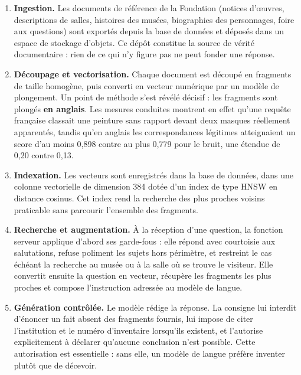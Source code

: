 \begin{enumerate}
  \item \textbf{Ingestion.} Les documents de référence de la Fondation (notices d'œuvres, descriptions de salles, histoires des musées,
        biographies des personnages, foire aux questions) sont exportés depuis
        la base de données et déposés dans un espace de stockage d'objets. Ce
        dépôt constitue la source de vérité documentaire : rien de ce qui n'y
        figure pas ne peut fonder une réponse.

  \item \textbf{Découpage et vectorisation.} Chaque document est découpé en
        fragments de taille homogène, puis converti en vecteur numérique par un
        modèle de plongement. Un point de méthode s'est révélé décisif : les
        fragments sont plongés \textbf{en anglais}. Les mesures conduites
        montrent en effet qu'une requête française classait une peinture sans
        rapport devant deux masques réellement apparentés, tandis qu'en anglais
        les correspondances légitimes atteignaient un score d'au moins 0,898
        contre au plus 0,779 pour le bruit, une étendue de 0,20 contre 0,13.

  \item \textbf{Indexation.} Les vecteurs sont enregistrés dans la base de
        données, dans une colonne vectorielle de dimension 384 dotée d'un index
        de type HNSW en distance cosinus. Cet index rend la recherche des plus
        proches voisins praticable sans parcourir l'ensemble des fragments.

  \item \textbf{Recherche et augmentation.} À la réception d'une question, la
        fonction serveur applique d'abord ses garde-fous : elle répond avec
        courtoisie aux salutations, refuse poliment les sujets hors périmètre,
        et restreint le cas échéant la recherche au musée ou à la salle où se
        trouve le visiteur. Elle convertit ensuite la question en vecteur,
        récupère les fragments les plus proches et compose l'instruction
        adressée au modèle de langue.

  \item \textbf{Génération contrôlée.} Le modèle rédige la réponse. La consigne
        lui interdit d'énoncer un fait absent des fragments fournis, lui impose
        de citer l'institution et le numéro d'inventaire lorsqu'ils existent, et
        l'autorise explicitement à déclarer qu'aucune conclusion n'est possible.
        Cette autorisation est essentielle : sans elle, un modèle de langue
        préfère inventer plutôt que de décevoir.
\end{enumerate}

